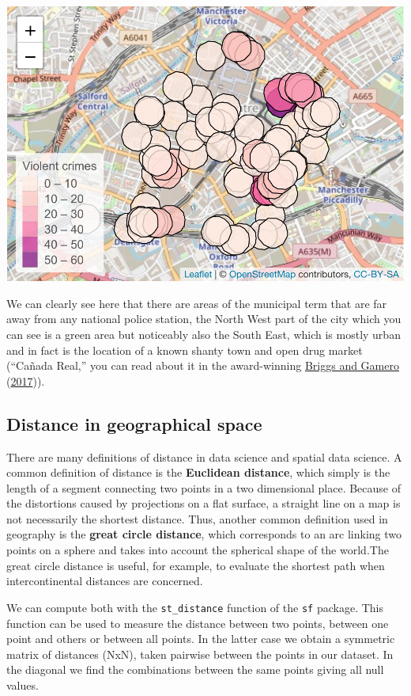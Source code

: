 \documentclass[
]{book}
\begin{document}
\includegraphics{crime_mapping_files/figure-latex/unnamed-chunk-52-1.pdf}

We can clearly see here that there are areas of the municipal term that are far away from any national police station, the North West part of the city which you can see is a green area but noticeably also the South East, which is mostly urban and in fact is the location of a known shanty town and open drug market (``Cañada Real,'' you can read about it in the award-winning \protect\hyperlink{ref-Briggs_2017}{Briggs and Gamero} (\protect\hyperlink{ref-Briggs_2017}{2017})).

\hypertarget{distance-in-geographical-space}{%
\subsection{Distance in geographical space}\label{distance-in-geographical-space}}

There are many definitions of distance in data science and spatial data science. A common definition of distance is the \textbf{Euclidean distance}, which simply is the length of a segment connecting two points in a two dimensional place. Because of the distortions caused by projections on a flat surface, a straight line on a map is not necessarily the shortest distance. Thus, another common definition used in geography is the \textbf{great circle distance}, which corresponds to an arc linking two points on a sphere and takes into account the spherical shape of the world.The great circle distance is useful, for example, to evaluate the shortest path when intercontinental distances are concerned.

We can compute both with the \texttt{st\_distance} function of the \texttt{sf} package. This function can be used to measure the distance between two points, between one point and others or between all points. In the latter case we obtain a symmetric matrix of distances (NxN), taken pairwise between the points in our dataset. In the diagonal we find the combinations between the same points giving all null values.
\end{document}
